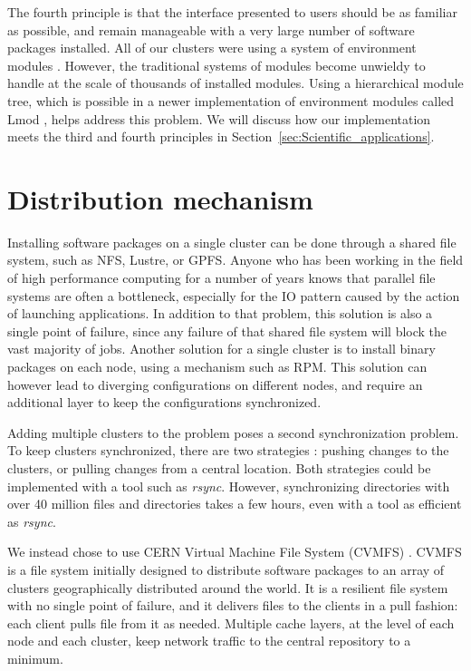 \documentclass[sigconf]{acmart}
\begin{document}
The fourth principle is that the interface presented to users should be as familiar as possible, and remain manageable with a very large number of software packages installed. All of our clusters were using a system of environment modules \cite{Modules1991,Modules1996}. However, the traditional systems of modules become unwieldy to handle at the scale of thousands of installed modules. Using a hierarchical module tree, which is possible in a newer implementation of environment modules called Lmod \cite{Lmod}, helps address this problem. We will discuss how our implementation meets the third and fourth principles in Section~\ref{sec:Scientific_applications}.

\section{Distribution mechanism}
\label{sec:Distribution_mechanism}
Installing software packages on a single cluster can be done through a shared file system, such as NFS, Lustre, or GPFS. Anyone who has been working in the field of high performance computing for a number of years knows that parallel file systems are often a bottleneck, especially for the IO pattern caused by the action of launching applications. In addition to that problem, this solution is also a single point of failure, since any failure of that shared file system will block the vast majority of jobs. Another solution for a single cluster is to install binary packages on each node, using a mechanism such as RPM. This solution can however lead to diverging configurations on different nodes, and require an additional layer to keep the configurations synchronized. 

Adding multiple clusters to the problem poses a second synchronization problem. To keep clusters synchronized, there are two strategies : pushing changes to the clusters, or pulling changes from a central location. Both strategies could be implemented with a tool such as {\it rsync}. However, synchronizing directories with over 40 million files and  directories takes a few hours, even with a tool as efficient as {\it rsync}. 

We instead chose to use CERN Virtual Machine File System (CVMFS) \cite{CVMFS}. CVMFS is a file system initially designed to distribute software packages to an array of clusters geographically distributed around the world. It is a resilient file system with no single point of failure, and it delivers files to the clients in a pull fashion: each client pulls file from it as needed. Multiple cache layers, at the level of each node and each cluster, keep network traffic to the central repository to a minimum.
\end{document}
